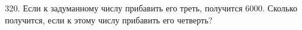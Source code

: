 320. Если к задуманному числу прибавить его треть, получится 6000. Сколько получится, если к этому числу прибавить его четверть?\\
